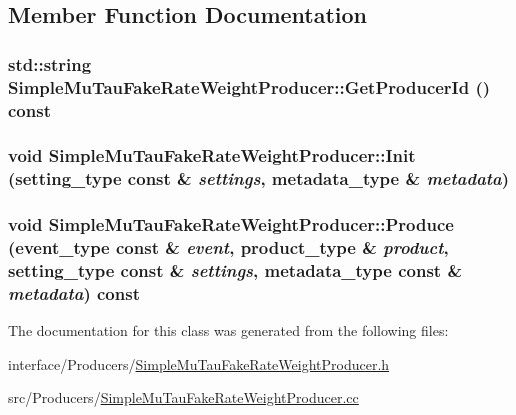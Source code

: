 \subsection{Member Function Documentation}
\hypertarget{classSimpleMuTauFakeRateWeightProducer_a2714e7efceb501143c18768665ce0a92}{
\subsubsection[{GetProducerId}]{\setlength{\rightskip}{0pt plus 5cm}std::string SimpleMuTauFakeRateWeightProducer::GetProducerId () const}}
\label{classSimpleMuTauFakeRateWeightProducer_a2714e7efceb501143c18768665ce0a92}
\hypertarget{classSimpleMuTauFakeRateWeightProducer_a394c600233ec859eac5f5147686ee579}{
\subsubsection[{Init}]{\setlength{\rightskip}{0pt plus 5cm}void SimpleMuTauFakeRateWeightProducer::Init (setting\_\-type const \& {\em settings}, \/  metadata\_\-type \& {\em metadata})}}
\label{classSimpleMuTauFakeRateWeightProducer_a394c600233ec859eac5f5147686ee579}
\hypertarget{classSimpleMuTauFakeRateWeightProducer_ae34820676c70aefa5563f811ba22611d}{
\subsubsection[{Produce}]{\setlength{\rightskip}{0pt plus 5cm}void SimpleMuTauFakeRateWeightProducer::Produce (event\_\-type const \& {\em event}, \/  product\_\-type \& {\em product}, \/  setting\_\-type const \& {\em settings}, \/  metadata\_\-type const \& {\em metadata}) const}}
\label{classSimpleMuTauFakeRateWeightProducer_ae34820676c70aefa5563f811ba22611d}


The documentation for this class was generated from the following files:\begin{DoxyCompactItemize}
\item 
interface/Producers/\hyperlink{SimpleMuTauFakeRateWeightProducer_8h}{SimpleMuTauFakeRateWeightProducer.h}\item 
src/Producers/\hyperlink{SimpleMuTauFakeRateWeightProducer_8cc}{SimpleMuTauFakeRateWeightProducer.cc}\end{DoxyCompactItemize}
